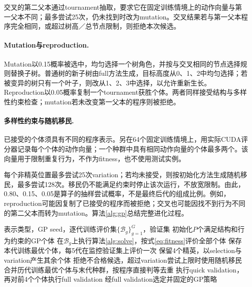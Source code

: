 交叉的第二父本通过tournament抽取，要求它在固定训练情境上的动作向量与第一父本不同；最多尝试25次，仍未找到时改为mutation。交叉结果若与第一父本程序完全相同，或超过树高／总节点限制，则拒绝本次候选。

\paragraph{Mutation与reproduction.}
Mutation以0.15概率被选中，均匀选择一个树角色，并按与交叉相同的节点选择规则替换子树。普通树的新子树由full方法生成，目标高度从0、1、2中均匀选择；若被变异的树只有一个叶子，则改从1、2、3中选择，以允许重新生长。Reproduction以0.05概率复制一个tournament获胜个体。两者同样接受结构与多样性约束检查；mutation若未改变第一父本的程序则被拒绝。

\paragraph{多样性约束与随机移民.}
已接受的个体须具有不同的程序表示。另在64个固定训练情境上，用实际CUDA评分器记录每个个体的动作向量；一个种群中具有相同动作向量的个体最多两个。该向量用于限制重复行为，不作为fitness，也不使用测试实例。

每个非精英位置最多尝试25次variation；若均未接受，则按初始化方法生成随机移民，最多尝试128次。移民仍不能满足约束时停止该次运行，不放宽限制。由此，0.80、0.15、0.05是算子的抽样尝试概率，不是最终后代的组成比例。例如，reproduction可能因复制了已接受的程序而被拒绝；交叉也可能因找不到行为不同的第二父本而转为mutation。算法\ref{alg:gp}总结完整进化过程。

\begin{algorithm}[tb]
\caption{GP搜索策略的离线进化与选择}
\label{alg:gp}
\begin{algorithmic}[1]
\Require 表示类型，GP seed，逐代训练评价集$\{\mathcal B_g\}_{g=1}^G$，验证集
\State 初始化$P$个满足结构和行为约束的GP个体
 \State 在$\mathcal B_g$上执行算法\ref{alg:solve}，按式\eqref{eq:fitness}评价全部个体
 \State 保存本代训练最优个体，每5代在监控验证集上评价一次
  \State 保留4个精英，以selection与variation产生其余个体
  \State 拒绝不合格候选，超过variation尝试上限时使用随机移民
 \EndIf
\EndFor
\State 合并历代训练最优个体与末代种群，按程序直接判等去重
\State 执行quick validation，再对前4个个体执行full validation
\State \Return 经full validation选定并固定的GP策略
\end{algorithmic}
\end{algorithm}
